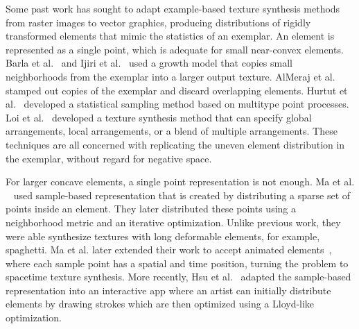 \newtext
{
Some past work has sought to adapt example-based texture synthesis methods
from raster images to vector graphics, producing distributions of
rigidly transformed elements that mimic the statistics of an exemplar.
An element is represented as a single point, which is adequate for small near-convex elements.
Barla et al.~\cite{Barla2006} and Ijiri et al.~\cite{Ijiri2008} used a growth model that copies small neighborhoods
from the exemplar into a larger output texture.  AlMeraj et al.~\cite{AlMeraj2013}
stamped out copies of the exemplar and discard overlapping elements.
Hurtut et al.~\cite{Hurtut2009} developed a statistical sampling method based
on multitype point processes.  
Loi et al.~\cite{Loi2017} developed a texture synthesis method that
can specify global arrangements, local arrangements, or a blend of multiple arrangements.
These techniques are all concerned with replicating
the uneven element distribution in the exemplar, without regard for negative space.
}

\newtext
{
For larger concave elements, a single point representation is not enough.
Ma et al. ~\cite{Ma2011} used sample-based representation that
is created by distributing a sparse set of points inside an element.
They later distributed these points using a neighborhood metric and an iterative optimization.
Unlike previous work, they were able synthesize textures with long deformable elements, for example, spaghetti.
Ma et al. later extended their work to accept animated elements~\cite{Ma2013}, where
each sample point has a spatial and time position, turning the problem to spacetime texture synthesis.
More recently, Hsu et al.~\cite{Hsu2020} adapted the sample-based representation into an interactive app
where an artist can initially distribute elements by drawing strokes
which are then optimized using a Lloyd-like optimization.
}




